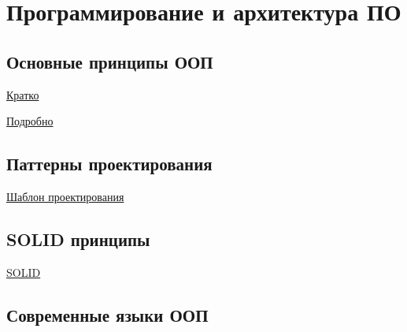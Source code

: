 \documentclass{article}
\begin{document}
\section{ Программирование и архитектура ПО}

\subsection{Основные принципы ООП}

\href{https://tproger.ru/translations/oop-principles-cheatsheet/#:~:text=%D0%91%D0%B0%D0%B7%D0%BE%D0%B2%D1%8B%D0%B5%20%D0%BF%D1%80%D0%B8%D0%BD%D1%86%D0%B8%D0%BF%D1%8B%20%D0%9E%D0%9E%D0%9F,%D0%BC%D0%B5%D1%85%D0%B0%D0%BD%D0%B8%D0%B7%D0%BC%20%D0%B4%D0%BB%D1%8F%20%D0%BF%D0%BE%D0%B2%D1%82%D0%BE%D1%80%D0%BD%D0%BE%D0%B3%D0%BE%20%D0%B8%D1%81%D0%BF%D0%BE%D0%BB%D1%8C%D0%B7%D0%BE%D0%B2%D0%B0%D0%BD%D0%B8%D1%8F%20%D0%BA%D0%BE%D0%B4%D0%B0.}{Кратко}

\href{https://training.epam.ua/News/Items/275?lang=ru}{Подробно}

\subsection{Паттерны проектирования}

\href{https://ru.wikipedia.org/wiki/%D0%A8%D0%B0%D0%B1%D0%BB%D0%BE%D0%BD_%D0%BF%D1%80%D0%BE%D0%B5%D0%BA%D1%82%D0%B8%D1%80%D0%BE%D0%B2%D0%B0%D0%BD%D0%B8%D1%8F}{Шаблон проектирования}

\subsection{SOLID принципы}

\href{https://ru.wikipedia.org/wiki/SOLID_(%D0%BE%D0%B1%D1%8A%D0%B5%D0%BA%D1%82%D0%BD%D0%BE-%D0%BE%D1%80%D0%B8%D0%B5%D0%BD%D1%82%D0%B8%D1%80%D0%BE%D0%B2%D0%B0%D0%BD%D0%BD%D0%BE%D0%B5_%D0%BF%D1%80%D0%BE%D0%B3%D1%80%D0%B0%D0%BC%D0%BC%D0%B8%D1%80%D0%BE%D0%B2%D0%B0%D0%BD%D0%B8%D0%B5)#:~:text=%D0%9F%D1%80%D0%B8%D0%BD%D1%86%D0%B8%D0%BF%D1%8B%20SOLID%20%E2%80%94%20%D1%8D%D1%82%D0%BE%20%D1%80%D1%83%D0%BA%D0%BE%D0%B2%D0%BE%D0%B4%D1%81%D1%82%D0%B2%D0%B0%2C%20%D0%BA%D0%BE%D1%82%D0%BE%D1%80%D1%8B%D0%B5,%D0%BA%D0%BE%D0%B4%D0%B0%20%D1%81%20%D1%81%D0%BE%D0%B1%D0%BB%D1%8E%D0%B4%D0%B5%D0%BD%D0%B8%D0%B5%D0%BC%20%D0%BF%D1%80%D0%B8%D0%BD%D1%86%D0%B8%D0%BF%D0%BE%D0%B2%20SOLID.}{SOLID}

\subsection{Современные языки ООП}
\end{document}
